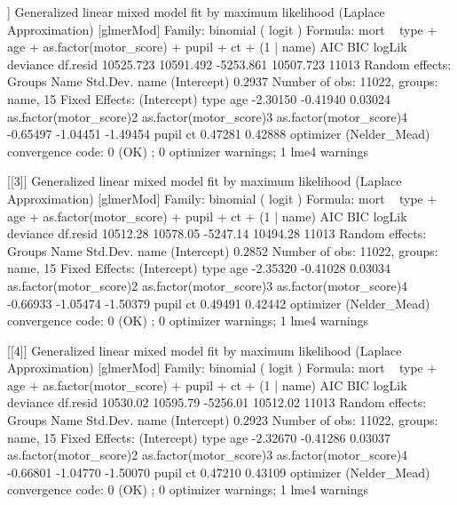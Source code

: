 \documentclass[
]{jss}
\begin{document}
\begin{CodeChunk}
\begin{CodeOutput}
[[2]]
Generalized linear mixed model fit by maximum likelihood (Laplace
  Approximation) [glmerMod]
 Family: binomial  ( logit )
Formula: mort ~ type + age + as.factor(motor_score) + pupil + ct + (1 |  
    name)
      AIC       BIC    logLik  deviance  df.resid 
10525.723 10591.492 -5253.861 10507.723     11013 
Random effects:
 Groups Name        Std.Dev.
 name   (Intercept) 0.2937  
Number of obs: 11022, groups:  name, 15
Fixed Effects:
            (Intercept)                     type                      age  
               -2.30150                 -0.41940                  0.03024  
as.factor(motor_score)2  as.factor(motor_score)3  as.factor(motor_score)4  
               -0.65497                 -1.04451                 -1.49454  
                  pupil                       ct  
                0.47281                  0.42888  
optimizer (Nelder_Mead) convergence code: 0 (OK) ; 0 optimizer warnings; 1 lme4 warnings 

[[3]]
Generalized linear mixed model fit by maximum likelihood (Laplace
  Approximation) [glmerMod]
 Family: binomial  ( logit )
Formula: mort ~ type + age + as.factor(motor_score) + pupil + ct + (1 |  
    name)
     AIC      BIC   logLik deviance df.resid 
10512.28 10578.05 -5247.14 10494.28    11013 
Random effects:
 Groups Name        Std.Dev.
 name   (Intercept) 0.2852  
Number of obs: 11022, groups:  name, 15
Fixed Effects:
            (Intercept)                     type                      age  
               -2.35320                 -0.41028                  0.03034  
as.factor(motor_score)2  as.factor(motor_score)3  as.factor(motor_score)4  
               -0.66933                 -1.05474                 -1.50379  
                  pupil                       ct  
                0.49491                  0.42442  
optimizer (Nelder_Mead) convergence code: 0 (OK) ; 0 optimizer warnings; 1 lme4 warnings 

[[4]]
Generalized linear mixed model fit by maximum likelihood (Laplace
  Approximation) [glmerMod]
 Family: binomial  ( logit )
Formula: mort ~ type + age + as.factor(motor_score) + pupil + ct + (1 |  
    name)
     AIC      BIC   logLik deviance df.resid 
10530.02 10595.79 -5256.01 10512.02    11013 
Random effects:
 Groups Name        Std.Dev.
 name   (Intercept) 0.2923  
Number of obs: 11022, groups:  name, 15
Fixed Effects:
            (Intercept)                     type                      age  
               -2.32670                 -0.41286                  0.03037  
as.factor(motor_score)2  as.factor(motor_score)3  as.factor(motor_score)4  
               -0.66801                 -1.04770                 -1.50070  
                  pupil                       ct  
                0.47210                  0.43109  
optimizer (Nelder_Mead) convergence code: 0 (OK) ; 0 optimizer warnings; 1 lme4 warnings 


\end{CodeOutput}
\end{CodeChunk}
\end{document}
